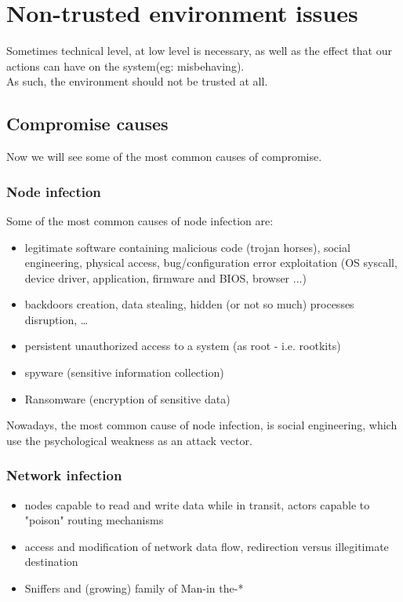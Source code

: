 \chapter{Non-trusted environment issues}
Sometimes technical level, at low level is necessary, as well as the
effect that our actions can have on the system(eg: misbehaving).\\ 
As such, the environment should not be trusted at all.
\section{Compromise causes}
Now we will see some of the most common causes of compromise.
\subsection{Node infection}
Some of the most common causes of node infection are:
\begin{itemize}
  \item legitimate software containing malicious code (trojan horses),
    social engineering, physical access, bug/configuration error
    exploitation (OS syscall, device driver, application, firmware and
    BIOS, browser ...)
  \item backdoors creation, data stealing, hidden (or not so much)
    processes disruption, …
  \item persistent unauthorized access to a system (as root - i.e.
    rootkits)
  \item spyware (sensitive information collection)
  \item Ransomware (encryption of sensitive data)
\end{itemize}
Nowadays, the most common cause of node infection, is social
engineering, which use the psychological weakness as an attack vector.
\subsection{Network infection}
\begin{itemize}
  \item nodes capable to read and write data while in transit, actors capable to "poison" routing mechanisms
  \item access and modification of network data flow, redirection versus illegitimate destination
  \item Sniffers and (growing) family of Man-in the-*
\end{itemize}
